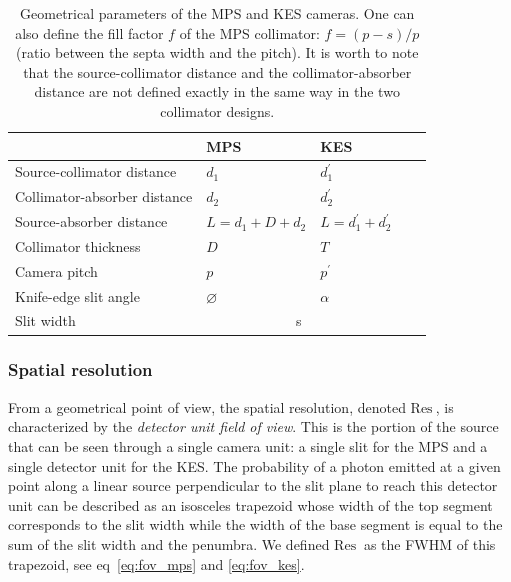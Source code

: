 \documentclass[a4paper,english,12pt]{article}
\begin{document}
\begin{table}[h]
\centering
\begin{tabular}{lllll}
	\midrule
																& MPS               & KES \\
	\midrule
	Source-collimator distance		& $d_1$             & $d_1^{'}$ \\
 	Collimator-absorber distance	& $d_2$             & $d_2^{'}$ \\
	Source-absorber distance			& $L=d_1+D+d_2$			& $L=d_1^{'}+d_2^{'}$\\
 	Collimator thickness 					& $D$               & $T$ \\
	Camera pitch									& $p$								& $p^{'}$\\
	Knife-edge slit angle					& $\varnothing$			& $\alpha$\\	
	\cline{2-3}
	Slit width										& \multicolumn{2}{c}{s} \\
	\midrule
\end{tabular}
\caption{Geometrical parameters of the MPS and KES cameras. One can also define the fill factor $f$ of the MPS collimator: $f=(p-s)/p$ (ratio between the septa width and the pitch). It is worth to note that the source-collimator distance and the collimator-absorber distance are not defined exactly in the same way in the two collimator designs.}
\label{table:CamerasParameters}
\end{table}



\subsubsection{Spatial resolution}

\newcommand\FOV{\textrm{Res}\,}
\newcommand\MPS{\textrm{MPS}}
\newcommand\KES{\textrm{KES}}
\newcommand\du{}
\newcommand\DE{\textrm{Eff}\,}

From a geometrical point of view, the spatial resolution, denoted $\FOV_{\du}$, is characterized by the \textit{detector unit field of view}. This is the portion of
the source that can be seen through a single camera unit: a single slit for the MPS and a single detector unit for the KES. The probability of a photon emitted at a
given point along a linear source perpendicular to the slit plane to reach
this detector unit can be described as an isosceles trapezoid whose width of the top segment corresponds to the slit width while the width of the base segment is equal to the sum of the slit width and the penumbra. We defined $\FOV_{\du}$
as the FWHM of this trapezoid, see eq~\ref{eq:fov_mps} and \ref{eq:fov_kes}.
\end{document}
